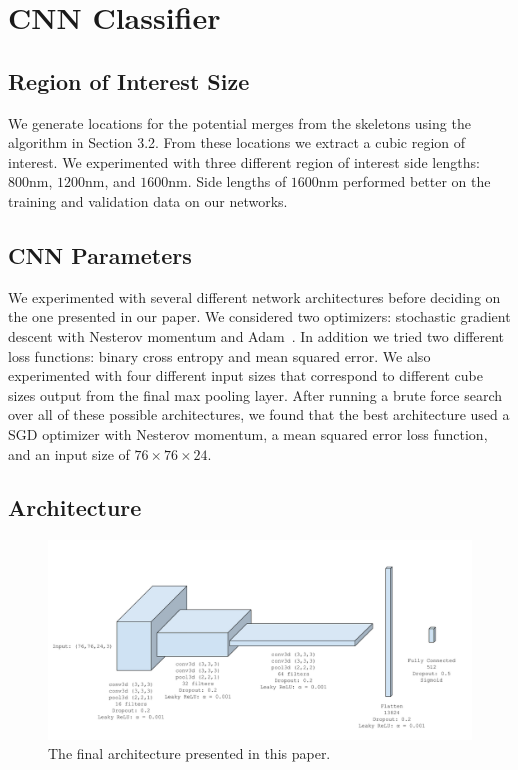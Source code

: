 \section{CNN Classifier}

\subsection{Region of Interest Size}

We generate locations for the potential merges from the skeletons using the algorithm in Section 3.2.
From these locations we extract a cubic region of interest.
We experimented with three different region of interest side lengths: $800 \textrm{nm}$, $1200 \textrm{nm}$, and $1600 \textrm{nm}$. 
Side lengths of $1600 \textrm{nm}$ performed better on the training and validation data on our networks. 

\subsection{CNN Parameters}

We experimented with several different network architectures before deciding on the one presented in our paper. 
We considered two optimizers: stochastic gradient descent with Nesterov momentum and Adam~\cite{kingma2014adam}.
In addition we tried two different loss functions: binary cross entropy and mean squared error.
We also experimented with four different input sizes that correspond to different cube sizes output from the final max pooling layer. 
After running a brute force search over all of these possible architectures, we found that the best architecture used a SGD optimizer with Nesterov momentum, a mean squared error loss function, and an input size of $76 \times 76 \times 24$. 

\subsection{Architecture}

\begin{figure}
	\centering
	\includegraphics[width=0.9\linewidth]{./figures/architecture.png}
	\caption{The final architecture presented in this paper.}
	\label{fig:architecture}
\end{figure}

